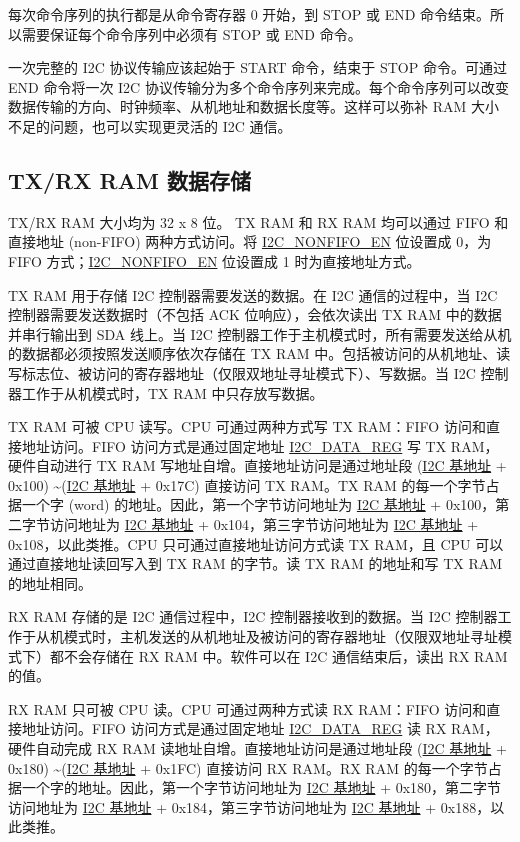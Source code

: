 \documentclass[main\_\_CN.tex]{subfiles}
\begin{document}
每次命令序列的执行都是从命令寄存器 0 开始，到 STOP 或 END 命令结束。所以需要保证每个命令序列中必须有 STOP 或 END 命令。

一次完整的 I2C 协议传输应该起始于 START 命令，结束于 STOP 命令。可通过 END 命令将一次 I2C 协议传输分为多个命令序列来完成。每个命令序列可以改变数据传输的方向、时钟频率、从机地址和数据长度等。这样可以弥补 RAM 大小不足的问题，也可以实现更灵活的 I2C 通信。

\subsection{TX/RX RAM 数据存储}
\label{subsubsec:i2c-txrx}

TX/RX RAM 大小均为 32 x 8 位。 TX RAM 和 RX RAM 均可以通过 FIFO 和 直接地址 (non-FIFO) 两种方式访问。将 \hyperref[fielddesc:I2CNONFIFOEN]{I2C\_NONFIFO\_EN} 位设置成 0，为 FIFO 方式；\hyperref[fielddesc:I2CNONFIFOEN]{I2C\_NONFIFO\_EN} 位设置成 1 时为直接地址方式。

TX RAM 用于存储 I2C 控制器需要发送的数据。在 I2C 通信的过程中，当 I2C 控制器需要发送数据时（不包括 ACK 位响应），会依次读出 TX RAM 中的数据并串行输出到 SDA 线上。当 I2C 控制器工作于主机模式时，所有需要发送给从机的数据都必须按照发送顺序依次存储在 TX RAM 中。包括被访问的从机地址、读写标志位、被访问的寄存器地址（仅限双地址寻址模式下）、写数据。当 I2C 控制器工作于从机模式时，TX RAM 中只存放写数据。

TX RAM 可被 CPU 读写。CPU 可通过两种方式写 TX RAM：FIFO 访问和直接地址访问。FIFO 访问方式是通过固定地址 \hyperref[regdesc:I2CDATAREG]{I2C\_DATA\_REG} 写 TX RAM，硬件自动进行 TX RAM 写地址自增。直接地址访问是通过地址段 (\hyperref[tab:sysmem-base-address]{I2C 基地址} + 0x100) \textasciitilde (\hyperref[tab:sysmem-base-address]{I2C 基地址} + 0x17C) 直接访问 TX RAM。TX RAM 的每一个字节占据一个字 (word) 的地址。因此，第一个字节访问地址为 \hyperref[tab:sysmem-base-address]{I2C 基地址} + 0x100，第二字节访问地址为 \hyperref[tab:sysmem-base-address]{I2C 基地址} + 0x104，第三字节访问地址为 \hyperref[tab:sysmem-base-address]{I2C 基地址} + 0x108，以此类推。CPU 只可通过直接地址访问方式读 TX RAM，且 CPU 可以通过直接地址读回写入到 TX RAM 的字节。读 TX RAM 的地址和写 TX RAM 的地址相同。

RX RAM 存储的是 I2C 通信过程中，I2C 控制器接收到的数据。当 I2C 控制器工作于从机模式时，主机发送的从机地址及被访问的寄存器地址（仅限双地址寻址模式下）都不会存储在 RX RAM 中。软件可以在 I2C 通信结束后，读出 RX RAM 的值。

RX RAM 只可被 CPU 读。CPU 可通过两种方式读 RX RAM：FIFO 访问和直接地址访问。FIFO 访问方式是通过固定地址 \hyperref[regdesc:I2CDATAREG]{I2C\_DATA\_REG} 读 RX RAM，硬件自动完成 RX RAM 读地址自增。直接地址访问是通过地址段 (\hyperref[tab:sysmem-base-address]{I2C 基地址} + 0x180) \textasciitilde (\hyperref[tab:sysmem-base-address]{I2C 基地址} + 0x1FC) 直接访问 RX RAM。RX RAM 的每一个字节占据一个字的地址。因此，第一个字节访问地址为 \hyperref[tab:sysmem-base-address]{I2C 基地址} + 0x180，第二字节访问地址为 \hyperref[tab:sysmem-base-address]{I2C 基地址} + 0x184，第三字节访问地址为 \hyperref[tab:sysmem-base-address]{I2C 基地址} + 0x188，以此类推。
\end{document}
